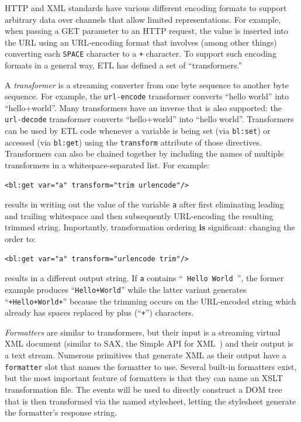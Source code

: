 \documentclass{www2003-submission}
\newcommand{\smtexttt}[1]{{\small\texttt{#1}}}
\begin{document}
HTTP and XML standards have various different encoding formats to
support arbitrary data over channels that allow limited
representations.  For example, when passing a GET parameter to an HTTP
request, the value is inserted into the URL using an URL-encoding
format that involves (among other things) converting each
\smtexttt{SPACE} character to a \smtexttt{+} character.  To support
such encoding formats in a general way, ETL has defined a set of
``transformers.''

A \emph{transformer} is a streaming converter from one byte sequence to
another byte sequence.  For example, the \smtexttt{url-encode}
transformer converts ``hello world'' into ``hello+world''.  Many
transformers have an inverse that is also supported: the
\smtexttt{url-decode} transformer converts ``hello+world'' into ``hello
world''.  Transformers can be used by ETL code whenever a variable is
being set (via \smtexttt{bl:set}) or accessed (via \smtexttt{bl:get})
using the \smtexttt{transform} attribute of those directives.
Transformers can also be chained together by including the names of
multiple transformers in a whitespace-separated list.  For example:

\begin{verbatim}
<bl:get var="a" transform="trim urlencode"/>
\end{verbatim}

\noindent results in writing out the value of the variable \smtexttt{a}
after first eliminating leading and trailing whitespace and then
subsequently URL-encoding the resulting trimmed string.  Importantly,
transformation ordering \textbf{is} significant: changing the order to:

\begin{verbatim}
<bl:get var="a" transform="urlencode trim"/>
\end{verbatim}

\noindent results in a different output string.  If \smtexttt{a} contains
``\smtexttt{ Hello World }'', the former example produces ``\smtexttt{Hello+World}'' while
the latter variant generates ``\smtexttt{+Hello+World+}'' because the
trimming occurs on the URL-encoded string which already has spaces
replaced by plus (``\smtexttt{+}'') characters.

\emph{Formatters} are similar to transformers, but their input is a streaming
virtual XML document (similar to SAX, the Simple API for XML~\cite{SAX})
and their output is a text stream.  Numerous primitives that generate
XML as their output have a \smtexttt{formatter} slot that names the
formatter to use. Several built-in formatters exist, but the most
important feature of formatters is that they can name an XSLT
transformation file.   The events will be used to directly construct a
DOM tree that is then transformed via the named stylesheet, letting the
stylesheet generate the formatter's response string.
\end{document}
